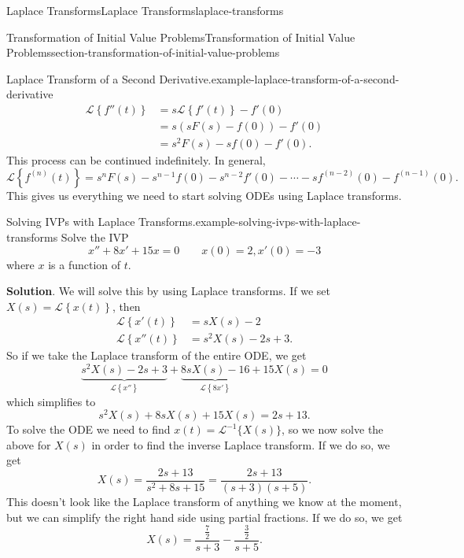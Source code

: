 \documentclass[oneside,10pt,]{book}
\numberwithin{equation}{section}
\newcommand{\Laplace}[1]{\mathcal{L}\left\{#1\right\}}
\newcommand{\qq}[1]{\quad\text{#1}\quad}
\newcommand{\amp}{&}
\begin{document}
\begin{chapterptx}{Laplace Transforms}{}{Laplace Transforms}{}{}{laplace-transforms}
\begin{sectionptx}{Transformation of Initial Value Problems}{}{Transformation of Initial Value Problems}{}{}{section-transformation-of-initial-value-problems}
\begin{example}{Laplace Transform of a Second Derivative.}{example-laplace-transform-of-a-second-derivative}
\begin{align*}
\Laplace{f''(t)} \amp= s\Laplace{f'(t)} - f'(0)\\
\amp= s(sF(s)-f(0)) - f'(0)\\
\amp= s^{2}F(s) - sf(0) - f'(0)\text{.}
\end{align*}
This process can be continued indefinitely. In general,%
\begin{equation*}
\Laplace{f^{(n)}(t)} = s^{n}F(s) - s^{n-1}f(0) - s^{n-2}f'(0) - \cdots -sf^{(n-2)}(0) - f^{(n-1)}(0).
\end{equation*}
This gives us everything we need to start solving ODEs using Laplace transforms.%
\end{example}
\begin{example}{Solving IVPs with Laplace Transforms.}{example-solving-ivps-with-laplace-transforms}%
\hypertarget{p-517}{}%
Solve the IVP%
\begin{equation*}
x''+8x'+15x = 0 \qq{} x(0) = 2, x'(0) = -3
\end{equation*}
where \(x\) is a function of \(t\).%
\par\smallskip%
\noindent\textbf{Solution}.\hypertarget{solution-83}{}\quad%
\hypertarget{p-518}{}%
We will solve this by using Laplace transforms. If we set \(X(s) = \Laplace{x(t)}\), then%
\begin{align*}
\Laplace{x'(t)} \amp= sX(s) - 2\\
\Laplace{x''(t)} \amp= s^{2}X(s) - 2s +3\text{.}
\end{align*}
So if we take the Laplace transform of the entire ODE, we get%
\begin{equation*}
\underbrace{s^{2}X(s) - 2s + 3}_{\Laplace{x''}} + \underbrace{8sX(s) - 16}_{\Laplace{8x'}} + 15X(s) = 0
\end{equation*}
which simplifies to%
\begin{equation*}
s^{2}X(s)+8sX(s)+15X(s) = 2s+13.
\end{equation*}
To solve the ODE we need to find \(x(t) = \mathcal{L}^{-1}\{X(s)\}\), so we now solve the above for \(X(s)\) in order to find the inverse Laplace transform. If we do so, we get%
\begin{equation*}
X(s) = \frac{2s+13}{s^{2}+8s+15} = \frac{2s+13}{(s+3)(s+5)}.
\end{equation*}
This doesn't look like the Laplace transform of anything we know at the moment, but we can simplify the right hand side using partial fractions. If we do so, we get%
\begin{equation*}
X(s) = \frac{\frac{7}{2}}{s+3} - \frac{\frac{3}{2}}{s+5}.

\end{equation*}
\end{example}
\end{sectionptx}
\end{chapterptx}
\end{document}

